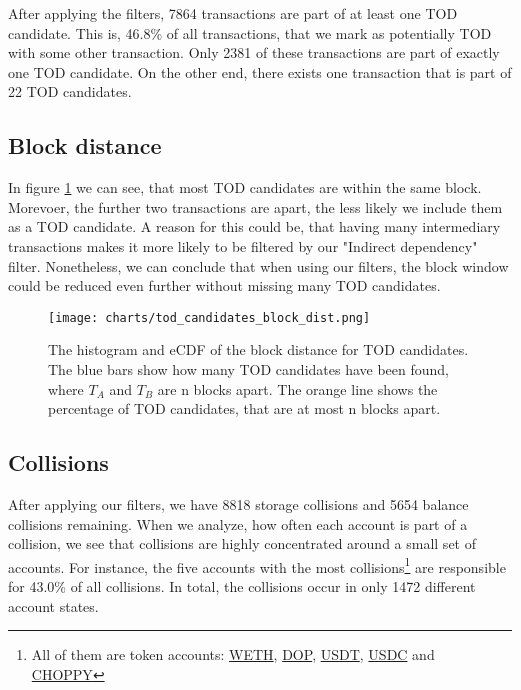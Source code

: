 \documentclass[draft,final]{vutinfth} %
\begin{document}
After applying the filters, 7864 transactions are part of at least one TOD candidate. This is, 46.8\% of all transactions, that we mark as potentially TOD with some other transaction. Only 2381 of these transactions are part of exactly one TOD candidate. On the other end, there exists one transaction that is part of 22 TOD candidates.

\subsection{Block distance}

In figure \ref{fig:tod_block_dist} we can see, that most TOD candidates are within the same block. Morevoer, the further two transactions are apart, the less likely we include them as a TOD candidate. A reason for this could be, that having many intermediary transactions makes it more likely to be filtered by our "Indirect dependency" filter. Nonetheless, we can conclude that when using our filters, the block window could be reduced even further without missing many TOD candidates.

\begin{figure}[h]
    \centering
    \texttt{[image: charts/tod\_candidates\_block\_dist.png]}
    \caption[Block distances of TOD candidates]{The histogram and eCDF of the block distance for TOD candidates. The blue bars show how many TOD candidates have been found, where $T_A$ and $T_B$ are n blocks apart. The orange line shows the percentage of TOD candidates, that are at most n blocks apart.}
    \label{fig:tod_block_dist}
\end{figure}

\subsection{Collisions}

After applying our filters, we have 8818 storage collisions and 5654 balance collisions remaining. When we analyze, how often each account is part of a collision, we see that collisions are highly concentrated around a small set of accounts. For instance, the five accounts with the most collisions\footnote{All of them are token accounts: \href{https://etherscan.io/address/0xc02aaa39b223fe8d0a0e5c4f27ead9083c756cc2}{WETH}, \href{https://etherscan.io/address/0x97a9a15168c22b3c137e6381037e1499c8ad0978}{DOP}, \href{https://etherscan.io/address/0xdac17f958d2ee523a2206206994597c13d831ec7}{USDT}, \href{https://etherscan.io/address/0xa0b86991c6218b36c1d19d4a2e9eb0ce3606eb48}{USDC} and \href{https://etherscan.io/address/0xf938346d7117534222b48d09325a6b8162b3a9e7}{CHOPPY}} are responsible for 43.0\% of all collisions. In total, the collisions occur in only 1472 different account states.
\end{document}
